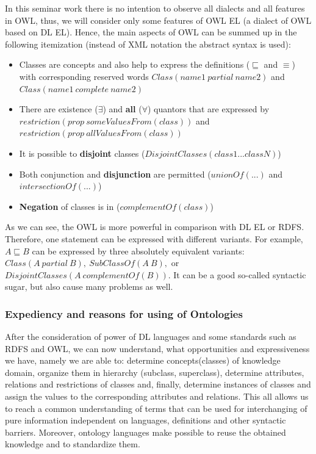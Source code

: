 		In this seminar work there is no intention to observe all dialects and all features in OWL, thus, we will consider only some features of OWL EL (a dialect of OWL based on DL EL). Hence, the main aspects of OWL can be summed up in the following itemization (instead of XML notation the abstract syntax is used): 
			\begin{itemize}
				\item Classes are concepts and also help to express the definitions ($\sqsubseteq$ and $\equiv$) with corresponding reserved words $Class(name1\  partial\ name2)$ and $Class(name1\ complete\ name2)$
				\item There are existence ($\exists$) and \textbf{all} ($\forall$) quantors that are expressed by \newline
				 $restriction(prop\ someValuesFrom(class))$ and $restriction(prop\  allValuesFrom(class))$
				\item It is possible to \textbf{disjoint} classes ($DisjointClasses(class1 ... classN)$)
				\item Both conjunction and \textbf{disjunction} are permitted ($unionOf(...)$ and $intersectionOf(...)$)
				\item \textbf{Negation} of classes is in ($complementOf(class)$)   
			\end{itemize}
		As we can see, the OWL is more powerful in comparison with DL EL or RDFS. Therefore, one statement can be expressed with different variants. For example, $A \sqsubseteq B$ can be expressed by three absolutely equivalent variants: $Class(A\ partial\ B),\ SubClassOf(A\  B),$ or $DisjointClasses(A\ complementOf(B))$. It can be a good so-called syntactic sugar, but also cause many problems as well.  
		\subsubsection{Expediency and reasons for using of Ontologies}
		After the consideration of power of DL languages and some standards such as RDFS and OWL, we can now understand, what opportunities and expressiveness we have, namely we are able to: determine concepts(classes) of knowledge domain, organize them in hierarchy (subclass, superclass), determine attributes, relations and restrictions of classes and, finally, determine instances of classes and assign the values to the corresponding attributes and relations. This all allows us to reach a common understanding of terms that can be used for interchanging of pure information independent on languages, definitions and other syntactic barriers. Moreover, ontology languages make possible to reuse the obtained knowledge and to standardize them. 
		
